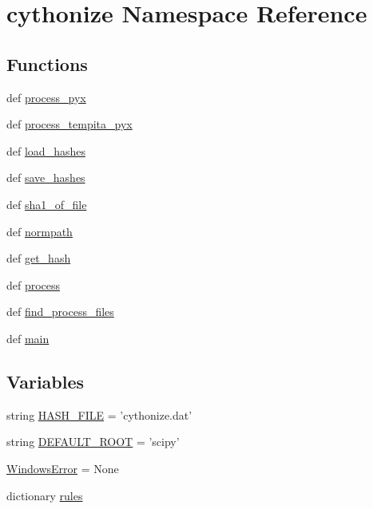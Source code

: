 \hypertarget{namespacecythonize}{}\section{cythonize Namespace Reference}
\label{namespacecythonize}
\subsection*{Functions}
\begin{DoxyCompactItemize}
\item 
def \hyperlink{namespacecythonize_ade094892939721079f1d2fcffa2244c1}{process\+\_\+pyx}
\item 
def \hyperlink{namespacecythonize_a90651724c53549379688fee2ac2fc42e}{process\+\_\+tempita\+\_\+pyx}
\item 
def \hyperlink{namespacecythonize_afaf6fcb371c534e1112816d6d8890eb5}{load\+\_\+hashes}
\item 
def \hyperlink{namespacecythonize_a16a382f312c96f8bac08d4dd6bc19937}{save\+\_\+hashes}
\item 
def \hyperlink{namespacecythonize_a9a8d7a664a1159f537632536284c24c6}{sha1\+\_\+of\+\_\+file}
\item 
def \hyperlink{namespacecythonize_a23dfcc2c00f734a221f8d8da437e9571}{normpath}
\item 
def \hyperlink{namespacecythonize_a18c06a469f41d5de817b669190586e44}{get\+\_\+hash}
\item 
def \hyperlink{namespacecythonize_a830cc47d229daca5d795d7dc0828efca}{process}
\item 
def \hyperlink{namespacecythonize_a342ff16772747aab8e9fc2f0ee32cac8}{find\+\_\+process\+\_\+files}
\item 
def \hyperlink{namespacecythonize_aedbdebdcb027ca1c921b8142dd4b6341}{main}
\end{DoxyCompactItemize}
\subsection*{Variables}
\begin{DoxyCompactItemize}
\item 
string \hyperlink{namespacecythonize_a006880d3cafc2ebdcff8145cc99a2d5b}{H\+A\+S\+H\+\_\+\+F\+I\+L\+E} = 'cythonize.\+dat'
\item 
string \hyperlink{namespacecythonize_abc1a4ce1c368f8834c6b0957b32787f6}{D\+E\+F\+A\+U\+L\+T\+\_\+\+R\+O\+O\+T} = 'scipy'
\item 
\hyperlink{namespacecythonize_aa3d92bd79edcc39b70b133ae5c87d58f}{Windows\+Error} = None
\item 
dictionary \hyperlink{namespacecythonize_ab8544d028d2837fef869827b5e6e9dfc}{rules}
\end{DoxyCompactItemize}


